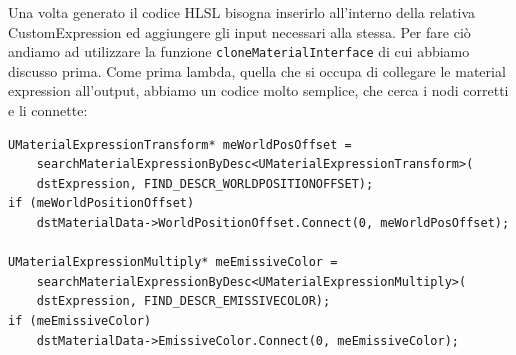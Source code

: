 \documentclass[main.tex]{subfiles}
\begin{document}
Una volta generato il codice HLSL bisogna inserirlo all'interno della relativa CustomExpression ed aggiungere gli input necessari alla stessa. Per fare ciò andiamo ad utilizzare la funzione \lstinline{cloneMaterialInterface} di cui abbiamo discusso prima. Come prima lambda, quella che si occupa di collegare le material expression all'output, abbiamo un codice molto semplice, che cerca i nodi corretti e li connette:
\begin{lstlisting}
UMaterialExpressionTransform* meWorldPosOffset =
    searchMaterialExpressionByDesc<UMaterialExpressionTransform>(
    dstExpression, FIND_DESCR_WORLDPOSITIONOFFSET);
if (meWorldPositionOffset)
    dstMaterialData->WorldPositionOffset.Connect(0, meWorldPosOffset);

UMaterialExpressionMultiply* meEmissiveColor =
    searchMaterialExpressionByDesc<UMaterialExpressionMultiply>(
    dstExpression, FIND_DESCR_EMISSIVECOLOR);
if (meEmissiveColor)
    dstMaterialData->EmissiveColor.Connect(0, meEmissiveColor);
\end{lstlisting}
\end{document}
